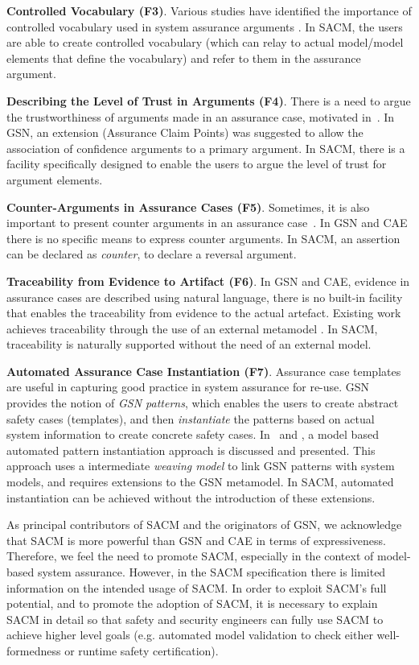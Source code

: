 \textbf{Controlled Vocabulary (F3)}. Various studies have identified the importance of controlled vocabulary used in system assurance arguments \cite{luo2015safety, attwood2014use}. 
In SACM, the users are able to create controlled vocabulary (which can relay to actual model/model elements that define the vocabulary) and refer to them in the assurance argument. 

\textbf{Describing the Level of Trust in Arguments (F4)}. There is a need to argue the trustworthiness of arguments made in an assurance case, motivated in~\cite{hawkins2011new}. 
In GSN, an extension (Assurance Claim Points) was suggested to allow the association of confidence arguments to a primary argument.  
In SACM, there is a facility specifically designed to enable the users to argue the level of trust for argument elements.

\textbf{Counter-Arguments in Assurance Cases (F5)}. Sometimes, it is also important to present counter arguments in an assurance case~\cite{armstrong2004deconstruction}.
In GSN and CAE there is no specific means to express counter arguments. 
In SACM, an assertion can be declared as \textit{counter}, to declare a reversal argument.

\textbf{Traceability from Evidence to Artifact (F6)}. In GSN and CAE, evidence in assurance cases are described using natural language, there is no built-in facility that enables the traceability from evidence to the actual artefact. 
Existing work achieves traceability through the use of an external metamodel \cite{taguchi2014linking}.
In SACM, traceability is naturally supported without the need of an external model.

\textbf{Automated Assurance Case Instantiation (F7)}. Assurance case templates are useful in capturing good practice in system assurance for re-use.
GSN provides the notion of \textit{GSN patterns}, which enables the users to create abstract safety cases (templates), and then \textit{instantiate} the patterns based on actual system information to create concrete safety cases. 
In~\cite{hawkins2015need} and \cite{hawkins2015weaving}, a model based automated pattern instantiation approach is discussed and presented. 
This approach uses a intermediate \textit{weaving model} to link GSN patterns with system models, and requires extensions to the GSN metamodel. 
In SACM, automated instantiation can be achieved without the introduction of these extensions. 

As principal contributors of SACM and the originators of GSN, we acknowledge that SACM is more powerful than GSN and CAE in terms of expressiveness.
Therefore, we feel the need to promote SACM, especially in the context of model-based system assurance.
However, in the SACM specification there is limited information on the intended usage of SACM. 
In order to exploit SACM's full potential, and to promote the adoption of SACM, it is necessary to explain SACM in detail so that safety and security engineers can fully use SACM to achieve higher level goals (e.g. automated model validation to check either well-formedness or runtime safety certification). 

